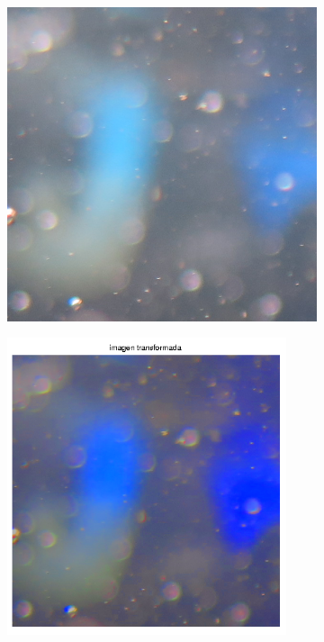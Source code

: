 \documentclass{article}
\begin{document}
\begin{figure}[H]
	\begin{subfigure}{0.5\textwidth}
	\centering
        \includegraphics[scale=0.7]{1923xx.png}
    \end{subfigure}\hfill
	\begin{subfigure}{0.5\textwidth}
	\centering
        \includegraphics[width=0.9\textwidth]{1923-transformada-20-2x-log.png}
    \end{subfigure}\hfill
\end{figure}\hfill
\end{document}
